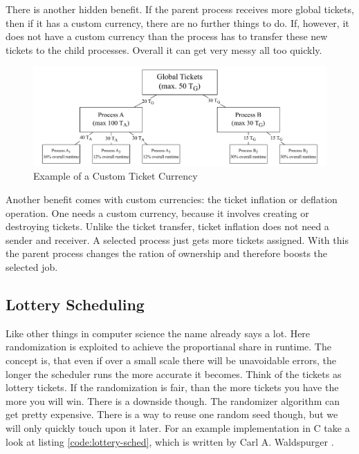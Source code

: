 There is another hidden benefit. If the parent process receives more global tickets, then if it has a custom currency, there are no further things to do.
If, however, it does not have a custom currency than the process has to transfer these new tickets to the child processes. Overall it can get very messy all too quickly.

\begin{figure}[h]
    \centering
    \includegraphics[width=\textwidth]{Assets/Ticket-Currency.pdf}
    \caption{Example of a Custom Ticket Currency}
    \label{fig:ticket-currencies}
\end{figure}
 
Another benefit comes with custom currencies: the ticket inflation or deflation operation.
One needs a custom currency, because it involves creating or destroying tickets. 
Unlike the ticket transfer, ticket inflation does not need a sender and receiver.
A selected process just gets more tickets assigned.
With this the parent process changes the ration of ownership and therefore boosts the selected job.


\subsection{Lottery Scheduling}

Like other things in computer science the name already says a lot. 
Here randomization is exploited to achieve the proportianal share in runtime.
The concept is, that even if over a small scale there will be unavoidable errors, the longer the scheduler runs the more accurate it becomes.
Think of the tickets as lottery tickets.
If the randomization is fair, than the more tickets you have the more you will win.
There is a downside though.
The randomizer algorithm can get pretty expensive.
There is a way to reuse one random seed though, but we will only quickly touch upon it later.
For an example implementation in C take a look at listing \ref{code:lottery-sched}, which is written by Carl A. Waldspurger \cite{waldspurger95}.

